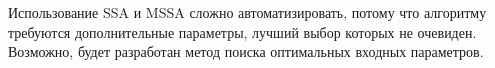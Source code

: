 \documentclass[specialist, substylefile = spbureport.rtx,
    subf,href,colorlinks=true, 12pt]{disser}
\begin{document}
        Использование SSA и MSSA сложно автоматизировать, потому что алгоритму требуются дополнительные параметры, лучший выбор которых не очевиден. Возможно, будет разработан метод поиска оптимальных входных параметров.        

        

    

	\renewcommand{\refname}{}
	\vspace{-25pt}
	
	
\end{document}
